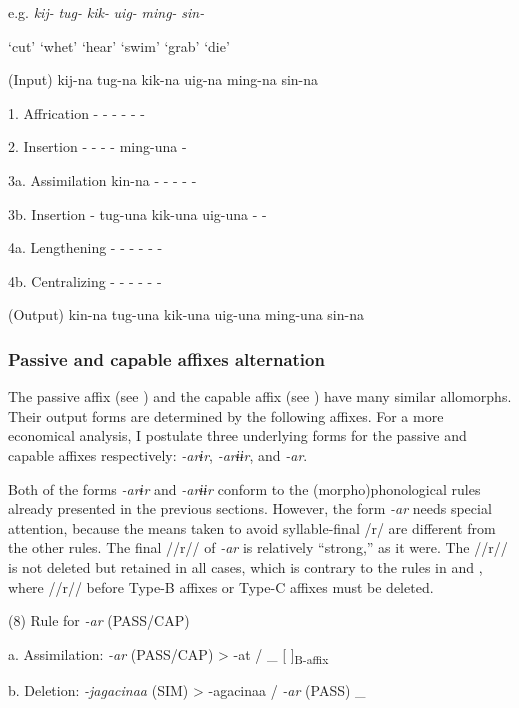   e.g.  \textit{kij-}  \textit{tug-}  \textit{kik-}  \textit{uig-}  \textit{ming-}  \textit{sin-}

    ‘cut’  ‘whet’  ‘hear’  ‘swim’  ‘grab’  ‘die’

  (Input)  kij-na  tug-na  kik-na  uig-na  ming-na  sin-na

1.  Affrication  {}-  {}-  {}-  {}-  {}-  {}-

2.  Insertion  {}-  {}-  {}-  {}-  ming-una  {}-

3a.  Assimilation  kin-na  {}-  {}-  {}-  {}-  {}-

3b.  Insertion  {}-  tug-una  kik-una  uig-una  {}-  {}-

4a.  Lengthening  {}-  {}-  {}-  {}-  {}-  {}-

4b.  Centralizing  {}-  {}-  {}-  {}-  {}-  {}-

  (Output)  kin-na  tug-una  kik-una  uig-una  ming-una  sin-na

\subsubsection{Passive and capable affixes alternation}

The passive affix (see ) and the capable affix (see ) have many similar allomorphs. Their output forms are determined by the following affixes. For a more economical analysis, I postulate three underlying forms for the passive and capable affixes respectively: \textit{{}-arɨr}, \textit{{}-arɨɨr}, and \textit{-ar}.

Both of the forms \textit{{}-arɨr} and \textit{{}-arɨɨr} conform to the (morpho)phonological rules already presented in the previous sections. However, the form \textit{{}-ar} needs special attention, because the means taken to avoid syllable-final /r/ are different from the other rules. The final //r// of \textit{{}-ar} is relatively “strong,” as it were. The //r// is not deleted but retained in all cases, which is contrary to the rules in  and , where //r// before Type-B affixes or Type-C affixes must be deleted.

(8)  Rule for \textit{{}-ar} (PASS/CAP)

  a.  Assimilation:  \textit{{}-ar} (PASS/CAP)  >  {}-at  /  \_  [  ]\textsubscript{B-affix}  

  b.  Deletion:  \textit{{}-jagacinaa} (SIM)  >  {}-agacinaa  /  \textit{{}-ar} (PASS)  \_

